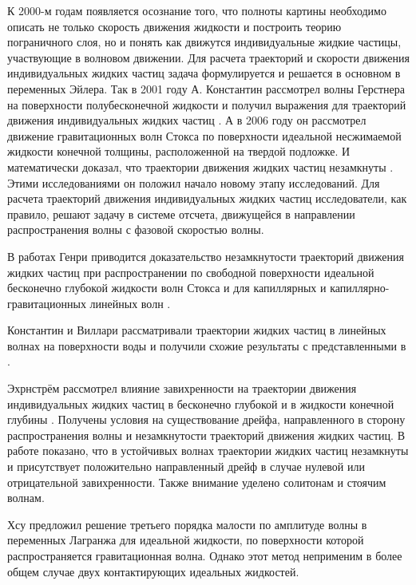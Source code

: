 К 2000-м годам появляется осознание того, что полноты картины необходимо описать не только скорость движения жидкости и построить теорию пограничного слоя, но и понять как движутся индивидуальные жидкие частицы, участвующие в волновом движении. Для расчета траекторий и скорости движения индивидуальных жидких частиц задача формулируется и решается в основном в переменных Эйлера. Так в 2001 году А. Константин рассмотрел волны Герстнера на поверхности полубесконечной жидкости и получил выражения для траекторий движения индивидуальных жидких частиц \cite{constantin2001deep}. А в 2006 году он рассмотрел движение гравитационных волн Стокса по поверхности идеальной несжимаемой жидкости конечной толщины, расположенной на твердой подложке. И математически доказал, что траектории движения жидких частиц незамкнуты \cite{constantin2006trajectories}. Этими исследованиями он положил начало новому этапу исследований. Для расчета траекторий движения индивидуальных жидких частиц исследователи, как правило, решают задачу в системе отсчета, движущейся в направлении распространения волны с фазовой скоростью волны. 

В работах Генри приводится доказательство незамкнутости траекторий движения жидких частиц при распространении по свободной поверхности идеальной бесконечно глубокой жидкости волн Стокса \cite{henry2006trajectories} и для капиллярных и капиллярно-гравитационных линейных волн \cite{henry2007particle,henry2007particle2}.

Константин и Виллари \cite{constantin2008particle,constantin2008particleDeepWater} рассматривали траектории жидких частиц в линейных волнах на поверхности воды и получили схожие результаты с представленными в \cite{constantin2006trajectories}. 

Эхрнстрём рассмотрел влияние завихренности на траектории движения индивидуальных жидких частиц в бесконечно глубокой \cite{ehrnstrom2007deep} и в жидкости конечной глубины \cite{ehrnstrom2008streamlines}. Получены условия на существование дрейфа, направленного в сторону распространения волны и незамкнутости траекторий движения жидких частиц. В работе \cite{ehrnstrom2009recent} показано, что в устойчивых волнах траектории жидких частиц незамкнуты и присутствует положительно направленный дрейф в случае нулевой или отрицательной завихренности. Также внимание уделено солитонам и стоячим волнам.


Хсу \cite{hsu2013particle} предложил решение третьего порядка малости по амплитуде волны в переменных Лагранжа для идеальной жидкости, по поверхности которой распространяется гравитационная волна. Однако этот метод неприменим в более общем случае двух контактирующих идеальных жидкостей.


